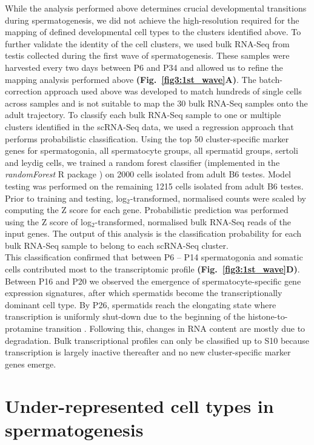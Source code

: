 While the analysis performed above determines crucial developmental transitions during spermatogenesis, we did not achieve the high-resolution required for the mapping of defined developmental cell types to the clusters identified above. To further validate the identity of the cell clusters, we used bulk RNA-Seq from testis collected during the first wave of spermatogenesis. These samples were harvested every two days between P6 and P34 and allowed us to refine the mapping analysis performed above \textbf{(Fig.~\ref{fig3:1st_wave}A)}. The batch-correction approach used above was developed to match hundreds of single cells across samples and is not suitable to map the 30 bulk RNA-Seq samples onto the adult trajectory. To classify each bulk RNA-Seq sample to one or multiple clusters identified in the scRNA-Seq data, we used a regression approach that performs probabilistic classification. Using the top 50 cluster-specific marker genes for spermatogonia, all spermatocyte groups, all spermatid groups, sertoli and leydig cells, we trained a random forest classifier (implemented in the \emph{randomForest} R package \citep{Liaw2002}) on 2000 cells isolated from adult B6 testes. Model testing was performed on the remaining 1215 cells isolated from adult B6 testes. Prior to training and testing, log$_2$-transformed, normalised counts were scaled by computing the Z score for each gene. Probabilistic prediction was performed using the Z score of log$_2$-transformed, normalised bulk RNA-Seq reads of the input genes. The output of this analysis is the classification probability for each bulk RNA-Seq sample to belong to each scRNA-Seq cluster.\\

This classification confirmed that between P6 – P14 spermatogonia and somatic cells contributed most to the transcriptomic profile \textbf{(Fig.~\ref{fig3:1st_wave}D)}. Between P16 and P20 we observed the emergence of spermatocyte-specific gene expression signatures, after which spermatids become the transcriptionally dominant cell type. By P26, spermatids reach the elongating state where transcription is uniformly shut-down due to the beginning of the histone-to-protamine transition \citep{Steger1999}. Following this, changes in RNA content are mostly due to degradation. Bulk transcriptional profiles can only be classified up to S10 because transcription is largely inactive thereafter and no new cluster-specific marker genes emerge.  

\newpage

\section{Under-represented cell types in spermatogenesis}

